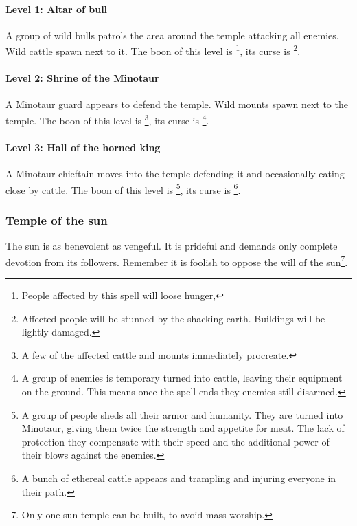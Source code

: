 \documentclass[a4paper]{book}
\begin{document}
			\paragraph{Level 1: Altar of bull}
				A group of wild bulls patrols the area around the temple attacking
				all enemies.
				Wild cattle spawn next to it.
				The boon of this level is \footnote{
					People affected by this spell will loose hunger,
				},
				its curse is \footnote{
					Affected people will be stunned by the shacking earth.
					Buildings will be lightly damaged.
				}.

			\paragraph{Level 2: Shrine of the Minotaur}
				A Minotaur guard appears to defend the temple.
				Wild mounts spawn next to the temple.
				The boon of this level is \footnote{
					A few of the affected cattle and mounts immediately procreate.
				},
				its curse is \footnote{
					A group of enemies is temporary turned into cattle,
					leaving their equipment on the ground.
					This means once the spell ends they enemies still disarmed.
				}.

			\paragraph{Level 3: Hall of the horned king}
				A Minotaur chieftain moves into the temple defending it
				and occasionally eating close by cattle.
				The boon of this level is \footnote{
					A group of people sheds all their armor and humanity.
					They are turned into Minotaur, giving them twice the strength
					and appetite for meat.
					The lack of protection they compensate with their speed and the additional
					power of their blows against the enemies.
				},
				its curse is \footnote{
					A bunch of ethereal cattle appears and trampling and injuring everyone in their path.
				}.

		\subsubsection{Temple of the sun}
			The sun is as benevolent as vengeful.
			It is prideful and demands only complete devotion from its followers.
			Remember it is foolish to oppose the will of the sun\footnote{
				Only one sun temple can be built, to avoid mass worship.
			}.
\end{document}
